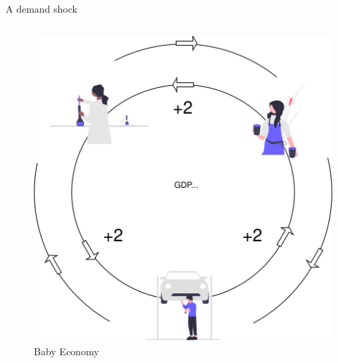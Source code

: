 \begin{frame}{A demand shock}
\protect\hypertarget{a-demand-shock}{}
\begin{columns}[T]
\begin{column}{0.48\textwidth}
\begin{overprint}


\begin{figure}
\centering
\includegraphics[width=1\textwidth,height=\textheight]{assets/circular.png}
\caption{Baby Economy}
\end{figure}



\end{overprint}
\end{column}
\end{columns}
\end{frame}
